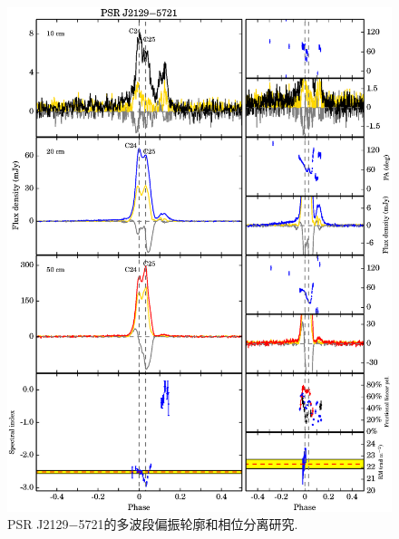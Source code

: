 \begin{figure}
\begin{center}
\includegraphics[width=6 in]{2129.ps}
\caption{PSR J2129$-$5721的多波段偏振轮廓和相位分离研究.}
\label{2129}
\end{center}
\end{figure}

